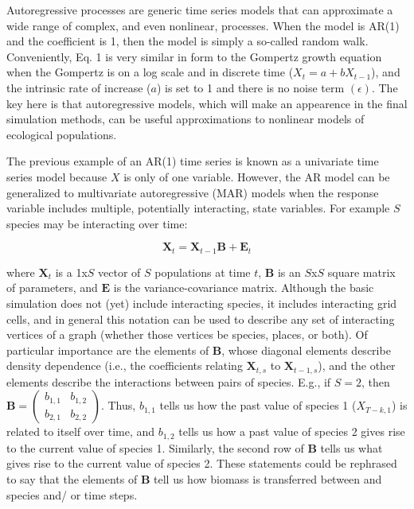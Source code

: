 \documentclass{article}\usepackage[]{graphicx}\usepackage[]{color}
\begin{document}
Autoregressive processes are generic time series models that can approximate a wide range of complex, and even nonlinear, processes. When the model is AR(1) and the coefficient is 1, then the model is simply a so-called random walk. Conveniently, Eq. 1 is very similar in form to the Gompertz growth equation when the Gompertz is on a log scale and in discrete time ($X_t=a+bX_{t-1}$), and the intrinsic rate of increase ($a$) is set to 1 and there is no noise term $(\epsilon)$. The key here is that autoregressive models, which will make an appearence in the final simulation methods, can be useful approximations to nonlinear models of ecological populations.

\par
The previous example of an AR(1) time series is known as a univariate time series model because $X$ is only of one variable. However, the AR model can be generalized to multivariate autoregressive (MAR) models when the response variable includes multiple, potentially interacting, state variables. For example $S$ species may be interacting over time:

\begin{equation}
	\bm{X}_{t}= \bm{X}_{t-1} \bm{B} + \bm{E}_t
\end{equation}

where $\bm{X}_t$ is a 1x$S$ vector of $S$ populations at time $t$, $\bm{B}$ is an $S$x$S$ square matrix of parameters, and $\bm{E}$ is the variance-covariance matrix. Although the basic simulation does not (yet) include interacting species, it includes interacting grid cells, and in general this notation can be used to describe any set of interacting vertices of a graph (whether those vertices be species, places, or both). Of particular importance are the elements of $\bm{B}$, whose diagonal elements describe density dependence (i.e., the coefficients relating $\bm{X}_{t,s}$ to $\bm{X}_{t-1,s}$), and the other elements describe the interactions between pairs of species. E.g., if $S=2$, then $\bm{B}= \left( \begin{array}{ccc} b_{1,1} & b_{1,2}\\ b_{2,1} & b_{2,2} \end{array} \right)$. Thus, $b_{1,1}$ tells us how the past value of species 1 ($X_{T-\mathit{k},1}$) is related to itself over time, and $b_{1,2}$ tells us how a past value of species 2 gives rise to the current value of species 1. Similarly, the second row of $\bm{B}$ tells us what gives rise to the current value of species 2. These statements could be rephrased to say that the elements of $\bm{B}$ tell us how biomass is transferred between and species and/ or time steps.
\end{document}
